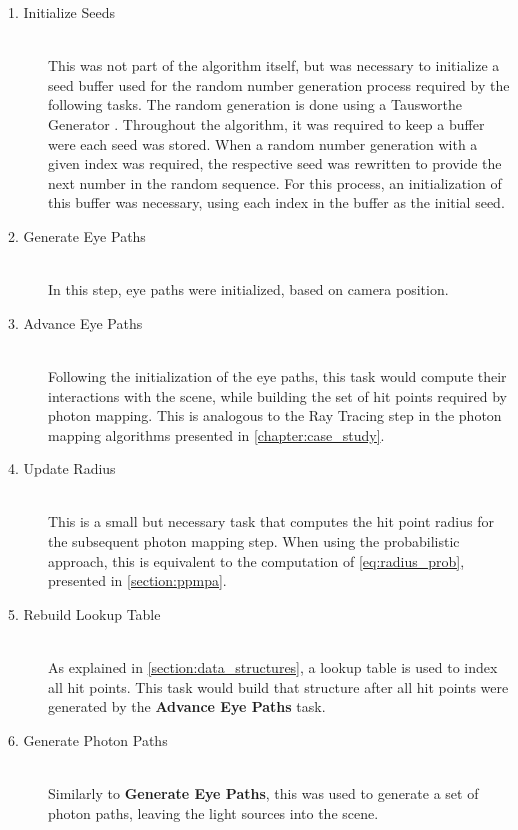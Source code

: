 \documentclass[main.tex]{subfiles}
\begin{document}
\begin{description}

\item[1. Initialize Seeds] \hfill \\
  This was not part of the algorithm itself, but was necessary to initialize a seed buffer used for the random number generation process required by the following tasks. The random generation is done using a Tausworthe Generator \cite{tausworthe1965random}. Throughout the algorithm, it was required to keep a buffer were each seed was stored. When a random number generation with a given index was required, the respective seed was rewritten to provide the next number in the random sequence. For this process, an initialization of this buffer was necessary, using each index in the buffer as the initial seed.

\item[2. Generate Eye Paths] \hfill \\
  In this step, eye paths were initialized, based on camera position.

\item[3. Advance Eye Paths] \hfill \\
  Following the initialization of the eye paths, this task would compute their interactions with the scene, while building the set of hit points required by photon mapping. This is analogous to the Ray Tracing step in the photon mapping algorithms presented in \cref{chapter:case_study}.

\item[4. Update Radius] \hfill \\
  This is a small but necessary task that computes the hit point radius for the subsequent photon mapping step. When using the probabilistic approach, this is equivalent to the computation of \cref{eq:radius_prob}, presented in \cref{section:ppmpa}.

\item[5. Rebuild Lookup Table] \hfill \\
  As explained in \cref{section:data_structures}, a lookup table is used to index all hit points. This task would build that structure after all hit points were generated by the \textbf{Advance Eye Paths} task.

\item[6. Generate Photon Paths] \hfill \\
  Similarly to \textbf{Generate Eye Paths}, this was used to generate a set of photon paths, leaving the light sources into the scene.


\end{description}
\end{document}
